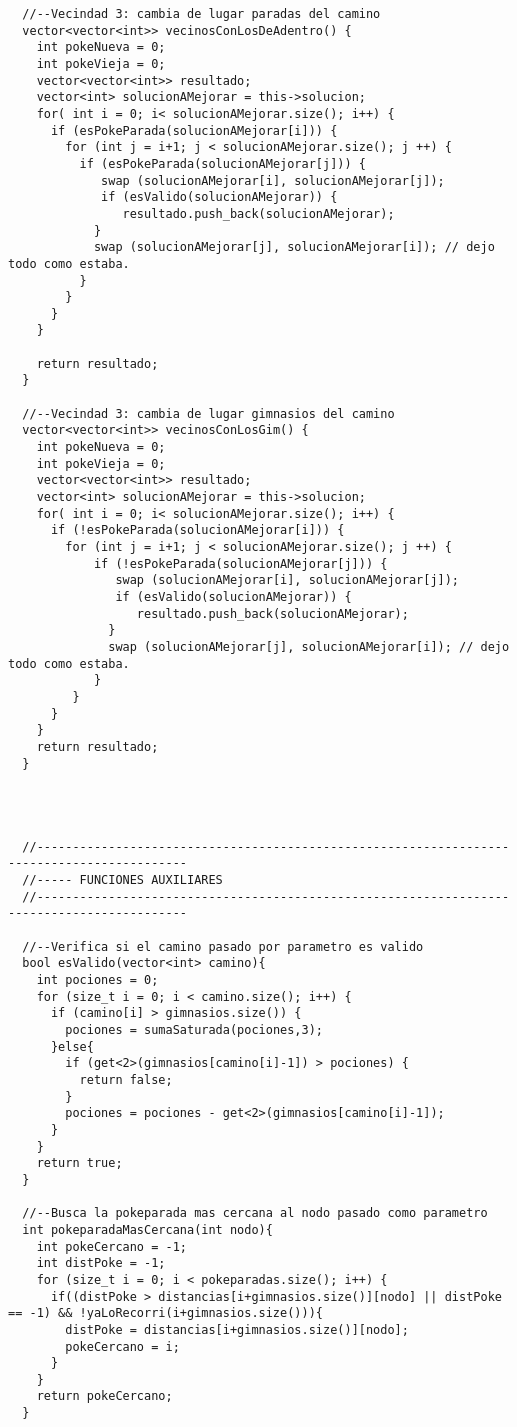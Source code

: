 \begin{lstlisting}
  //--Vecindad 3: cambia de lugar paradas del camino
  vector<vector<int>> vecinosConLosDeAdentro() {
    int pokeNueva = 0;
    int pokeVieja = 0;
    vector<vector<int>> resultado;
    vector<int> solucionAMejorar = this->solucion;
    for( int i = 0; i< solucionAMejorar.size(); i++) {
      if (esPokeParada(solucionAMejorar[i])) {
        for (int j = i+1; j < solucionAMejorar.size(); j ++) {
          if (esPokeParada(solucionAMejorar[j])) {
             swap (solucionAMejorar[i], solucionAMejorar[j]);
             if (esValido(solucionAMejorar)) {
                resultado.push_back(solucionAMejorar);
            }
            swap (solucionAMejorar[j], solucionAMejorar[i]); // dejo todo como estaba.
          }
        }
      }
    }

    return resultado;
  }

  //--Vecindad 3: cambia de lugar gimnasios del camino
  vector<vector<int>> vecinosConLosGim() {
    int pokeNueva = 0;
    int pokeVieja = 0;
    vector<vector<int>> resultado;
    vector<int> solucionAMejorar = this->solucion;
    for( int i = 0; i< solucionAMejorar.size(); i++) {
      if (!esPokeParada(solucionAMejorar[i])) {
        for (int j = i+1; j < solucionAMejorar.size(); j ++) {
            if (!esPokeParada(solucionAMejorar[j])) {
               swap (solucionAMejorar[i], solucionAMejorar[j]);
               if (esValido(solucionAMejorar)) {
                  resultado.push_back(solucionAMejorar);
              }
              swap (solucionAMejorar[j], solucionAMejorar[i]); // dejo todo como estaba.
            }
         }
      }
    }
    return resultado;
  }




  //-------------------------------------------------------------------------------------------
  //----- FUNCIONES AUXILIARES
  //-------------------------------------------------------------------------------------------

  //--Verifica si el camino pasado por parametro es valido
  bool esValido(vector<int> camino){
    int pociones = 0;
    for (size_t i = 0; i < camino.size(); i++) {
      if (camino[i] > gimnasios.size()) {
        pociones = sumaSaturada(pociones,3);
      }else{
        if (get<2>(gimnasios[camino[i]-1]) > pociones) {
          return false;
        }
        pociones = pociones - get<2>(gimnasios[camino[i]-1]);
      }
    }
    return true;
  }

  //--Busca la pokeparada mas cercana al nodo pasado como parametro
  int pokeparadaMasCercana(int nodo){
    int pokeCercano = -1;
    int distPoke = -1;
    for (size_t i = 0; i < pokeparadas.size(); i++) {
      if((distPoke > distancias[i+gimnasios.size()][nodo] || distPoke == -1) && !yaLoRecorri(i+gimnasios.size())){
        distPoke = distancias[i+gimnasios.size()][nodo];
        pokeCercano = i;
      }
    }
    return pokeCercano;
  }


\end{lstlisting}
